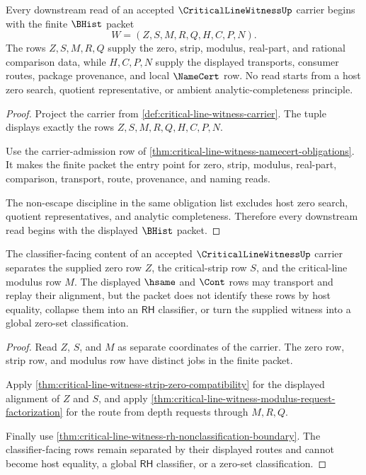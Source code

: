 \begin{theorem}
\label{thm:critical-line-witness-carrier-source}
Every downstream read of an accepted $\CriticalLineWitnessUp$ carrier begins with the finite $\BHist$ packet
$$
W=(Z,S,M,R,Q,H,C,P,N).
$$
The rows $Z,S,M,R,Q$ supply the zero, strip, modulus, real-part, and rational comparison data, while $H,C,P,N$ supply the displayed transports, consumer routes, package provenance, and local $\NameCert$ row. No read starts from a host zero search, quotient representative, or ambient analytic-completeness principle.
\end{theorem}
\begin{proof}
Project the carrier from \autoref{def:critical-line-witness-carrier}. The tuple displays exactly the rows $Z,S,M,R,Q,H,C,P,N$.

Use the carrier-admission row of \autoref{thm:critical-line-witness-namecert-obligations}. It makes the finite packet the entry point for zero, strip, modulus, real-part, comparison, transport, route, provenance, and naming reads.

The non-escape discipline in the same obligation list excludes host zero search, quotient representatives, and analytic completeness. Therefore every downstream read begins with the displayed $\BHist$ packet.
\end{proof}

\begin{theorem}
\label{thm:critical-line-witness-classifier-separation}
The classifier-facing content of an accepted $\CriticalLineWitnessUp$ carrier separates the supplied zero row $Z$, the critical-strip row $S$, and the critical-line modulus row $M$. The displayed $\hsame$ and $\Cont$ rows may transport and replay their alignment, but the packet does not identify these rows by host equality, collapse them into an $\mathsf{RH}$ classifier, or turn the supplied witness into a global zero-set classification.
\end{theorem}
\begin{proof}
Read $Z$, $S$, and $M$ as separate coordinates of the carrier. The zero row, strip row, and modulus row have distinct jobs in the finite packet.

Apply \autoref{thm:critical-line-witness-strip-zero-compatibility} for the displayed alignment of $Z$ and $S$, and apply \autoref{thm:critical-line-witness-modulus-request-factorization} for the route from depth requests through $M,R,Q$.

Finally use \autoref{thm:critical-line-witness-rh-nonclassification-boundary}. The classifier-facing rows remain separated by their displayed routes and cannot become host equality, a global $\mathsf{RH}$ classifier, or a zero-set classification.
\end{proof}

